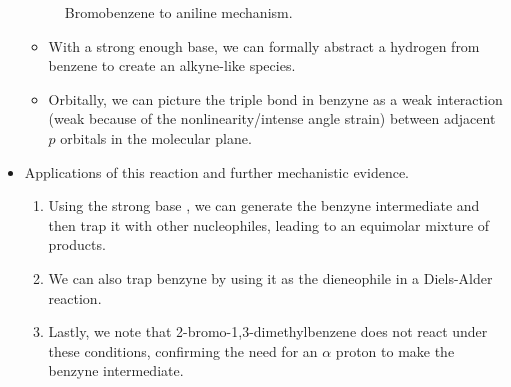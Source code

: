 \documentclass[../notes.tex]{subfiles}
\begin{document}
\begin{itemize}
\begin{figure}[h!]
        \centering
        \footnotesize
        \caption{Bromobenzene to aniline mechanism.}
        \label{fig:PhBrtoPhNH2}
    \end{figure}
    \begin{itemize}
        \item With a strong enough base, we can formally abstract a hydrogen from benzene to create an alkyne-like species.
        \item Orbitally, we can picture the triple bond in benzyne as a weak interaction (weak because of the nonlinearity/intense angle strain) between adjacent $p$ orbitals in the molecular plane.
    \end{itemize}
    \item Applications of this reaction and further mechanistic evidence.
    \begin{enumerate}
        \item Using the strong base , we can generate the benzyne intermediate and then trap it with other nucleophiles, leading to an equimolar mixture of products.
        \item We can also trap benzyne by using it as the dieneophile in a Diels-Alder reaction.
        \item Lastly, we note that 2-bromo-1,3-dimethylbenzene does not react under these conditions, confirming the need for an $\alpha$ proton to make the benzyne intermediate.
    \end{enumerate}
\end{itemize}
\end{document}
